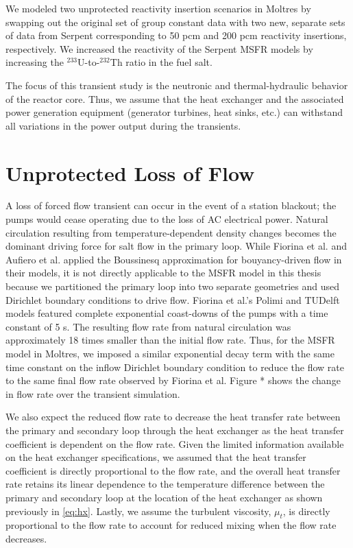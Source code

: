 We modeled two unprotected reactivity insertion scenarios in Moltres by
swapping out the original set of group constant data with two new, separate
sets of data from Serpent corresponding to 50 pcm and 200 pcm reactivity
insertions, respectively. We increased the reactivity of the Serpent
\gls{MSFR} models by increasing the $^{233}$U-to-$^{232}$Th ratio in the fuel
salt.

The focus of this transient study is the neutronic and thermal-hydraulic
behavior of the reactor core. Thus, we assume that the heat exchanger and the
associated power generation equipment (generator turbines, heat sinks, etc.)
can withstand all variations in the power output during the transients.


\section{Unprotected Loss of Flow}

A loss of forced flow transient can occur in the event of a station
blackout; the pumps would cease operating due to the loss of AC electrical
power. Natural circulation resulting from temperature-dependent density
changes becomes the dominant driving force for salt flow in the primary loop.
While Fiorina et al. \cite{fiorina_modelling_2014} and Aufiero et al.
\cite{aufiero_development_2014} applied the Boussinesq approximation for
bouyancy-driven flow in their models, it is not directly applicable to the
\gls{MSFR} model in this thesis because we partitioned the primary loop into
two separate geometries and used Dirichlet boundary conditions to drive flow.
Fiorina et al.'s Polimi and TUDelft models featured complete exponential
coast-downs of the pumps with a time constant of 5 s. The resulting flow rate
from natural circulation was approximately 18 times smaller than the initial
flow rate. Thus, for the \gls{MSFR} model in Moltres, we imposed a similar
exponential decay term with the same time constant on the inflow Dirichlet
boundary condition to reduce the flow rate to the same final flow rate
observed by Fiorina et al. Figure * shows the change in flow rate over the
transient simulation.

We also expect the reduced flow rate to decrease the heat transfer rate
between the primary and secondary loop through the heat exchanger as the heat
transfer coefficient is dependent on the flow rate. Given the limited
information available on the heat exchanger specifications, we assumed that
the heat transfer coefficient is directly proportional to the flow rate, and
the overall heat transfer rate retains its linear dependence to the
temperature difference between the primary and secondary loop at the location
of the heat exchanger as shown previously in \ref{eq:hx}. Lastly, we assume
the turbulent viscosity, $\mu_t$, is directly proportional to the flow rate to
account for reduced mixing when the flow rate decreases.



